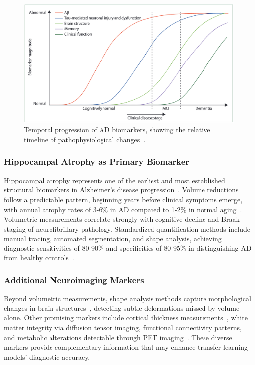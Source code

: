 \documentclass[12pt, a4paper]{article}
\begin{document}
\begin{figure}[htbp]
  \centering
  \includegraphics[width=\textwidth]{figures/biomarkers.png}
  \caption{Temporal progression of AD biomarkers, showing the relative timeline of pathophysiological changes~\cite{jack2013tracking}.}
  \label{fig:biomarker_progression}
\end{figure}

\subsubsection{Hippocampal Atrophy as Primary Biomarker}

Hippocampal atrophy represents one of the earliest and most established structural biomarkers in Alzheimer's disease progression~\cite{jack1992mr}. Volume reductions follow a predictable pattern, beginning years before clinical symptoms emerge, with annual atrophy rates of 3-6\% in AD compared to 1-2\% in normal aging~\cite{vemuri2010role}. Volumetric measurements correlate strongly with cognitive decline and Braak staging of neurofibrillary pathology. Standardized quantification methods include manual tracing, automated segmentation, and shape analysis, achieving diagnostic sensitivities of 80-90\% and specificities of 80-95\% in distinguishing AD from healthy controls~\cite{cuingnet2011automatic}.

\subsubsection{Additional Neuroimaging Markers}

Beyond volumetric measurements, shape analysis methods capture morphological changes in brain structures~\cite{ferrarini2006shape}, detecting subtle deformations missed by volume alone. Other promising markers include cortical thickness measurements~\cite{gutierrez2009patterns}, white matter integrity via diffusion tensor imaging, functional connectivity patterns, and metabolic alterations detectable through PET imaging~\cite{vemuri2010role}. These diverse markers provide complementary information that may enhance transfer learning models' diagnostic accuracy.
\end{document}
